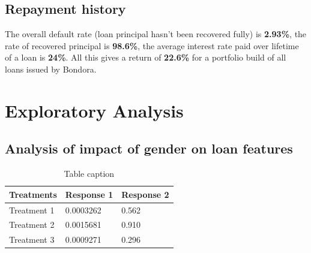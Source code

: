\documentclass[preprint,12pt]{elsarticle}
\begin{document}
\subsection{Repayment history}

The overall default rate (loan principal hasn't been recovered fully) is \textbf{2.93\%}, the rate of recovered principal is \textbf{98.6\%}, the average interest rate paid over lifetime of a loan is \textbf{24\%}. All this gives a return of \textbf{22.6\%} for a portfolio build of all loans issued by Bondora.

\section{Exploratory Analysis}

\subsection{Analysis of impact of gender on loan features}



\begin{table}[h]
\centering
\begin{tabular}{l l l}
\hline
\textbf{Treatments} & \textbf{Response 1} & \textbf{Response 2}\\
\hline
Treatment 1 & 0.0003262 & 0.562 \\
Treatment 2 & 0.0015681 & 0.910 \\
Treatment 3 & 0.0009271 & 0.296 \\
\hline
\end{tabular}
\caption{Table caption}
\end{table}








\end{document}
